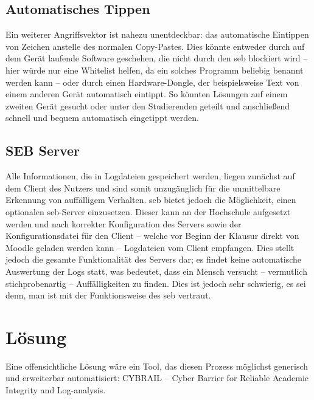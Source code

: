 \subsection{Automatisches Tippen}
Ein weiterer Angriffsvektor ist nahezu unentdeckbar: das automatische Eintippen von Zeichen anstelle des normalen Copy-Pastes. 
Dies könnte entweder durch auf dem Gerät laufende Software geschehen, die nicht durch den \gls{seb} blockiert wird – hier würde nur eine Whitelist helfen, da ein solches Programm beliebig benannt werden kann – oder durch einen Hardware-Dongle, der beispielsweise Text von einem anderen Gerät automatisch eintippt. 
So könnten Lösungen auf einem zweiten Gerät gesucht oder unter den Studierenden geteilt und anschließend schnell und bequem automatisch eingetippt werden.

\subsection{SEB Server}
Alle Informationen, die in Logdateien gespeichert werden, liegen zunächst auf dem Client des Nutzers und sind somit unzugänglich für die unmittelbare Erkennung von auffälligem Verhalten. 
\gls{seb} bietet jedoch die Möglichkeit, einen optionalen \gls{seb}-Server einzusetzen. 
Dieser kann an der Hochschule aufgesetzt werden und nach korrekter Konfiguration des Servers sowie der Konfigurationsdatei für den Client – welche vor Beginn der Klausur direkt von Moodle geladen werden kann – Logdateien vom Client empfangen. 
Dies stellt jedoch die gesamte Funktionalität des Servers dar; 
es findet keine automatische Auswertung der Logs statt, was bedeutet, dass ein Mensch versucht – vermutlich stichprobenartig – Auffälligkeiten zu finden. 
Dies ist jedoch sehr schwierig, es sei denn, man ist mit der Funktionsweise des \gls{seb} vertraut.

\section{Lösung}
Eine offensichtliche Lösung wäre ein Tool, das diesen Prozess möglichst generisch und erweiterbar automatisiert: CYBRAIL – Cyber Barrier for Reliable Academic Integrity and Log-analysis.




